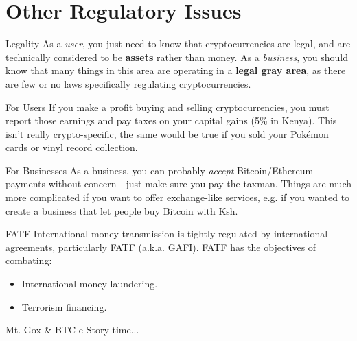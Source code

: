 \documentclass[14pt]{beamer}
\begin{document}
\section{Other Regulatory Issues}

\begin{frame}{Legality}
  As a \emph{user}, you just need to know that cryptocurrencies are legal, and
  are technically considered to be \textbf{assets} rather than money.
  \newline
  \newline
  As a \emph{business}, you should know that many things in this area are
  operating in a \textbf{legal gray area}, as there are few or no laws
  specifically regulating cryptocurrencies.
\end{frame}

\begin{frame}{For Users}
  If you make a profit buying and selling cryptocurrencies, you must report
  those earnings and pay taxes on your capital gains (5\% in Kenya).
  \newline
  \newline
  This isn't really crypto-specific, the same would be true if you sold your
  Pok\'{e}mon cards or vinyl record collection.
\end{frame}

\begin{frame}{For Businesses}
  As a business, you can probably \emph{accept} Bitcoin/Ethereum payments
  without concern---just make sure you pay the taxman.
  \newline
  \newline
  Things are much more complicated if you want to offer exchange-like services,
  e.g. if you wanted to create a business that let people buy Bitcoin with Ksh.
\end{frame}

\begin{frame}{FATF}
  International money transmission is tightly regulated by international
  agreements, particularly FATF (a.k.a. GAFI).
  \newline
  \newline
  FATF has the objectives of combating:
  \begin{itemize}
    \item International money laundering.
    \item Terrorism financing.
  \end{itemize}
\end{frame}

\begin{frame}{Mt. Gox \& BTC-e}
  Story time...
\end{frame}
\end{document}
